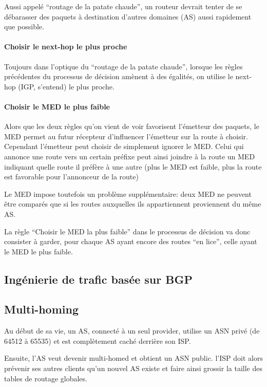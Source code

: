 \documentclass{article}
\begin{document}
\begin{sffamily}
Aussi appelé ``routage de la patate chaude'', un routeur devrait
tenter de se débarasser des paquets à destination d'autres domaines
(AS) aussi rapidement que possible.

\paragraph{Choisir le next-hop le plus proche}

Toujours dans l'optique du ``routage de la patate chaude'', lorsque
les règles précédentes du processus de décision amènent à des
égalités, on utilise le next-hop (IGP, s'entend) le plus proche.

\paragraph{Choisir le MED le plus faible}

Alors que les deux règles qu'on vient de voir favorisent l'émetteur
des paquets, le MED permet au futur récepteur d'influencer l'émetteur
sur la route à choisir. Cependant l'émetteur peut choisir de
simplement ignorer le MED. Celui qui annonce une route vers un certain
préfixe peut ainsi joindre à la route un MED indiquant quelle route il
préfère à une autre (plus le MED est faible, plus la route est
favorable pour l'annonceur de la route)

Le MED impose toutefois un problème supplémentaire: deux MED ne
peuvent être comparés que si les routes auxquelles ils appartiennent
proviennent du même AS.

La règle ``Choisir le MED la plus faible'' dans le processus de
décision va donc consister à garder, pour chaque AS ayant encore des
routes ``en lice'', celle ayant le MED le plus faible.

\subsection{Ingénierie de trafic basée sur BGP}

\subsection{Multi-homing}

Au début de sa vie, un AS, connecté à un seul provider, utilise un ASN
privé (de 64512 à 65535) et est complètement caché derrière son ISP.

Ensuite, l'AS veut devenir multi-homed et obtient un ASN public. l'ISP
doit alors prévenir ses autres clients qu'un nouvel AS existe et faire
ainsi grossir la taille des tables de routage globales.


\end{sffamily}
\end{document}
